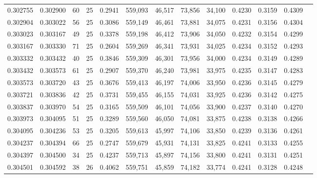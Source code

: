 \begin{tabular}{rrrrrrrrrrrrr}
0.302755 & 0.302900 &    60 &  25 &                                     0.2941 & 559,093 &  46,517 &  73,856 &  34,100 & 0.4230 & 0.3159 & 0.4309 \\
0.302904 & 0.303022 &    56 &  25 &                                     0.3086 & 559,149 &  46,461 &  73,881 &  34,075 & 0.4231 & 0.3156 & 0.4304 \\
0.303023 & 0.303167 &    49 &  25 &                                     0.3378 & 559,198 &  46,412 &  73,906 &  34,050 & 0.4232 & 0.3154 & 0.4299 \\
0.303167 & 0.303330 &    71 &  25 &                                     0.2604 & 559,269 &  46,341 &  73,931 &  34,025 & 0.4234 & 0.3152 & 0.4293 \\
0.303332 & 0.303432 &    40 &  25 &                                     0.3846 & 559,309 &  46,301 &  73,956 &  34,000 & 0.4234 & 0.3149 & 0.4289 \\
0.303432 & 0.303573 &    61 &  25 &                                     0.2907 & 559,370 &  46,240 &  73,981 &  33,975 & 0.4235 & 0.3147 & 0.4283 \\
0.303573 & 0.303720 &    43 &  25 &                                     0.3676 & 559,413 &  46,197 &  74,006 &  33,950 & 0.4236 & 0.3145 & 0.4279 \\
0.303721 & 0.303836 &    42 &  25 &                                     0.3731 & 559,455 &  46,155 &  74,031 &  33,925 & 0.4236 & 0.3142 & 0.4275 \\
0.303837 & 0.303970 &    54 &  25 &                                     0.3165 & 559,509 &  46,101 &  74,056 &  33,900 & 0.4237 & 0.3140 & 0.4270 \\
0.303973 & 0.304095 &    51 &  25 &                                     0.3289 & 559,560 &  46,050 &  74,081 &  33,875 & 0.4238 & 0.3138 & 0.4266 \\
0.304095 & 0.304236 &    53 &  25 &                                     0.3205 & 559,613 &  45,997 &  74,106 &  33,850 & 0.4239 & 0.3136 & 0.4261 \\
0.304237 & 0.304394 &    66 &  25 &                                     0.2747 & 559,679 &  45,931 &  74,131 &  33,825 & 0.4241 & 0.3133 & 0.4255 \\
0.304397 & 0.304500 &    34 &  25 &                                     0.4237 & 559,713 &  45,897 &  74,156 &  33,800 & 0.4241 & 0.3131 & 0.4251 \\
0.304501 & 0.304592 &    38 &  26 &                                     0.4062 & 559,751 &  45,859 &  74,182 &  33,774 & 0.4241 & 0.3128 & 0.4248 \\

\end{tabular}
